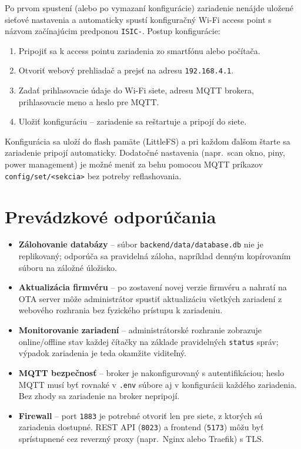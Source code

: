 Po prvom spustení (alebo po vymazaní konfigurácie) zariadenie nenájde uložené sieťové nastavenia a automaticky spustí konfiguračný Wi-Fi access point s názvom začínajúcim predponou \texttt{ISIC-}. Postup konfigurácie:

\begin{enumerate}
    \item Pripojiť sa k access pointu zariadenia zo smartfónu alebo počítača.
    \item Otvoriť webový prehliadač a prejsť na adresu \texttt{192.168.4.1}.
    \item Zadať prihlasovacie údaje do Wi-Fi siete, adresu MQTT brokera, prihlasovacie meno a heslo pre MQTT.
    \item Uložiť konfiguráciu -- zariadenie sa reštartuje a pripojí do siete.
\end{enumerate}

Konfigurácia sa uloží do flash pamäte (LittleFS) a pri každom ďalšom štarte sa zariadenie pripojí automaticky. Dodatočné nastavenia (napr.\ scan okno, piny, power management) je možné meniť za behu pomocou MQTT príkazov \texttt{config/set/<sekcia>} bez potreby reflashovania.

\section{Prevádzkové odporúčania}
\label{sec:deployment-operations}

\begin{itemize}
    \item \textbf{Zálohovanie databázy} -- súbor \texttt{backend/data/database.db} nie je replikovaný; odporúča sa pravidelná záloha, napríklad denným kopírovaním súboru na záložné úložisko.
    \item \textbf{Aktualizácia firmvéru} -- po zostavení novej verzie firmvéru a nahratí na OTA server môže administrátor spustiť aktualizáciu všetkých zariadení z webového rozhrania bez fyzického prístupu k zariadeniu.
    \item \textbf{Monitorovanie zariadení} -- administrátorské rozhranie zobrazuje online/offline stav každej čítačky na základe pravidelných \texttt{status} správ; výpadok zariadenia je teda okamžite viditeľný.
    \item \textbf{MQTT bezpečnosť} -- broker je nakonfigurovaný s autentifikáciou; heslo MQTT musí byť rovnaké v \texttt{.env} súbore aj v konfigurácii každého zariadenia. Bez zhody sa zariadenie na broker nepripojí.
    \item \textbf{Firewall} -- port \texttt{1883} je potrebné otvoriť len pre siete, z ktorých sú zariadenia dostupné. REST API (\texttt{8023}) a frontend (\texttt{5173}) môžu byť sprístupnené cez reverzný proxy (napr.\ Nginx alebo Traefik) s TLS.
\end{itemize}
